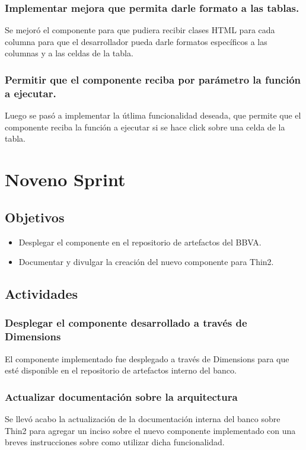 \subsubsection{Implementar mejora que permita darle formato a las tablas.}
Se mejoró el componente para que pudiera recibir clases HTML para cada columna
para que el desarrollador pueda darle formatos específicos a las columnas y a las celdas
de la tabla.
\subsubsection{Permitir que el componente reciba por parámetro la función a ejecutar.}
Luego se pasó a implementar la útlima funcionalidad deseada, que permite que el
componente reciba la función a ejecutar si se hace click sobre una celda de la tabla.

\section{Noveno Sprint}

\subsection{Objetivos}
\begin{itemize}
  \item Desplegar el componente en el repositorio de artefactos del BBVA.
  \item Documentar y divulgar la creación del nuevo componente para Thin2.
\end{itemize}
\subsection{Actividades}
\subsubsection{Desplegar el componente desarrollado a través de Dimensions}
El componente implementado fue desplegado a través de Dimensions para que esté
disponible en el repositorio de artefactos interno del banco.
\subsubsection{Actualizar documentación sobre la arquitectura}
Se llevó acabo la actualización de la documentación interna del banco sobre
Thin2 para agregar un inciso sobre el nuevo componente implementado con
una breves instrucciones sobre como utilizar dicha funcionalidad.

